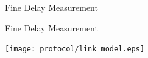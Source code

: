 \documentclass[compress,red]{beamer}
\begin{document}
% 
% 
% 
\logo{}
\begin{frame}{Fine Delay Measurement}


\end{frame}
\begin{frame}{Fine Delay Measurement}

  \begin{center}
  \texttt{[image: protocol/link\_model.eps]}
  \end{center}

\end{frame}
\end{document}
